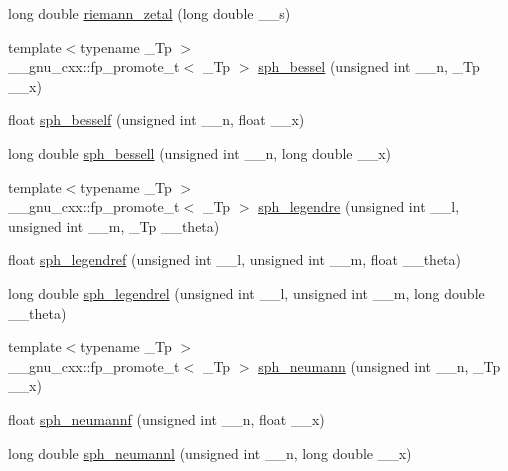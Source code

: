 \begin{DoxyCompactItemize}
\item 
long double \hyperlink{group__mathsf__std_ga1e92da3b878d75270f38d3ec9b513086}{riemann\+\_\+zetal} (long double \+\_\+\+\_\+s)
\item 
{\footnotesize template$<$typename \+\_\+\+Tp $>$ }\\\+\_\+\+\_\+gnu\+\_\+cxx\+::fp\+\_\+promote\+\_\+t$<$ \+\_\+\+Tp $>$ \hyperlink{group__mathsf__std_gad125841d7c85e461cb8954952e3a17c8}{sph\+\_\+bessel} (unsigned int \+\_\+\+\_\+n, \+\_\+\+Tp \+\_\+\+\_\+x)
\item 
float \hyperlink{group__mathsf__std_ga534e36e1dcefad8daec98920db16eec4}{sph\+\_\+besself} (unsigned int \+\_\+\+\_\+n, float \+\_\+\+\_\+x)
\item 
long double \hyperlink{group__mathsf__std_ga11d72b1af81ce9da3c878a25087ee927}{sph\+\_\+bessell} (unsigned int \+\_\+\+\_\+n, long double \+\_\+\+\_\+x)
\item 
{\footnotesize template$<$typename \+\_\+\+Tp $>$ }\\\+\_\+\+\_\+gnu\+\_\+cxx\+::fp\+\_\+promote\+\_\+t$<$ \+\_\+\+Tp $>$ \hyperlink{group__mathsf__std_gacef0d41a7ce572a9ace3437498794ed0}{sph\+\_\+legendre} (unsigned int \+\_\+\+\_\+l, unsigned int \+\_\+\+\_\+m, \+\_\+\+Tp \+\_\+\+\_\+theta)
\item 
float \hyperlink{group__mathsf__std_gaae635d28c06a3be2679901b382090852}{sph\+\_\+legendref} (unsigned int \+\_\+\+\_\+l, unsigned int \+\_\+\+\_\+m, float \+\_\+\+\_\+theta)
\item 
long double \hyperlink{group__mathsf__std_ga2f6618dea1847f09fd67f3c974c1910d}{sph\+\_\+legendrel} (unsigned int \+\_\+\+\_\+l, unsigned int \+\_\+\+\_\+m, long double \+\_\+\+\_\+theta)
\item 
{\footnotesize template$<$typename \+\_\+\+Tp $>$ }\\\+\_\+\+\_\+gnu\+\_\+cxx\+::fp\+\_\+promote\+\_\+t$<$ \+\_\+\+Tp $>$ \hyperlink{group__mathsf__std_ga01cdd716aaca8ff3c08f307800fd5220}{sph\+\_\+neumann} (unsigned int \+\_\+\+\_\+n, \+\_\+\+Tp \+\_\+\+\_\+x)
\item 
float \hyperlink{group__mathsf__std_ga789143122fa99536329bc2d1b1aac2f0}{sph\+\_\+neumannf} (unsigned int \+\_\+\+\_\+n, float \+\_\+\+\_\+x)
\item 
long double \hyperlink{group__mathsf__std_ga3cededa9b6e4601f190c3811e6aabfd6}{sph\+\_\+neumannl} (unsigned int \+\_\+\+\_\+n, long double \+\_\+\+\_\+x)
\end{DoxyCompactItemize}
